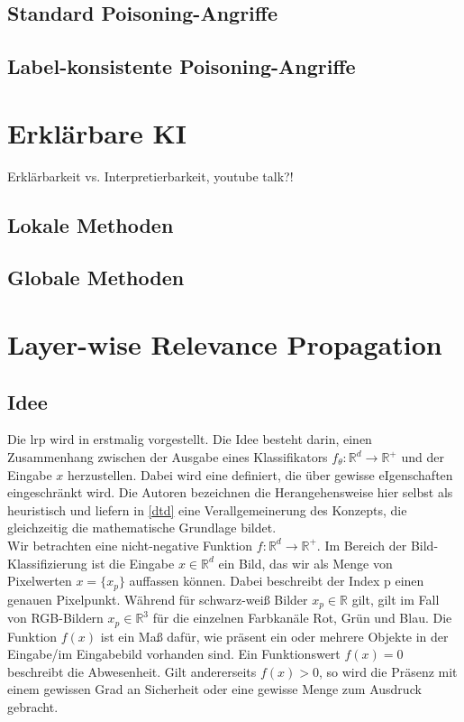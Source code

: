 \documentclass[twoside, 12pt,a4paper]{article}
\numberwithin{equation}{section}
\begin{document}
	\subsection{Standard Poisoning-Angriffe}
	\subsection{Label-konsistente Poisoning-Angriffe}
	
	\section{Erklärbare KI} \label{chapter_xai}
	
	Erklärbarkeit vs. Interpretierbarkeit, youtube talk?!
	
	\subsection{Lokale Methoden}
	
	\subsection{Globale Methoden}
	
	\section{Layer-wise Relevance Propagation} \label{chapter_lrp}
	\subsection{Idee}
	
	Die \gls{lrp} wird in \cite{LRP_first_paper} erstmalig vorgestellt. Die Idee besteht darin, einen Zusammenhang zwischen der Ausgabe eines Klassifikators $f_{\theta}: \mathbb{R}^d\to \mathbb{R^{+}}$ und der Eingabe $x$ herzustellen. Dabei wird eine definiert, die über gewisse eIgenschaften eingeschränkt wird. Die Autoren bezeichnen die Herangehensweise hier selbst als heuristisch und liefern in \ref{dtd} eine Verallgemeinerung des Konzepts, die gleichzeitig die mathematische Grundlage bildet.\\
	
	Wir betrachten eine nicht-negative Funktion $f: \mathbb{R}^d \to \mathbb{R}^{+}$. Im Bereich der Bild-Klassifizierung ist die Eingabe $x \in \mathbb{R}^d$ ein Bild, das wir als Menge von Pixelwerten $x=\lbrace x_p \rbrace$ auffassen können. Dabei beschreibt der Index p einen genauen Pixelpunkt. Während für schwarz-weiß Bilder $x_p \in \mathbb{R}$ gilt, gilt im Fall von RGB-Bildern $x_p \in \mathbb{R}^3$ für die einzelnen Farbkanäle Rot, Grün und Blau. Die Funktion $f(x)$ ist ein Maß dafür, wie präsent ein oder mehrere Objekte in der Eingabe/im Eingabebild vorhanden sind. Ein Funktionswert $f(x)=0$ beschreibt die Abwesenheit. Gilt andererseits $f(x) >0$, so wird die Präsenz mit einem gewissen Grad an Sicherheit oder eine gewisse Menge zum Ausdruck gebracht.\\
	
\end{document}
